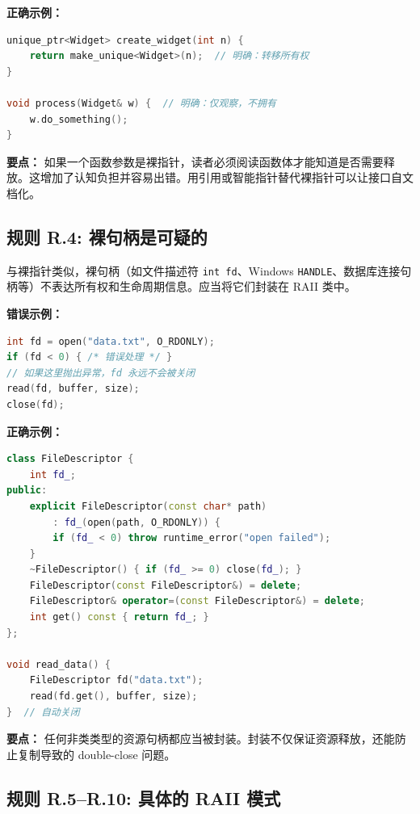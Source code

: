 \textbf{正确示例：}

\begin{lstlisting}[language=C++]
unique_ptr<Widget> create_widget(int n) {
    return make_unique<Widget>(n);  // 明确：转移所有权
}

void process(Widget& w) {  // 明确：仅观察，不拥有
    w.do_something();
}
\end{lstlisting}

\textbf{要点：} 如果一个函数参数是裸指针，读者必须阅读函数体才能知道是否需要释放。这增加了认知负担并容易出错。用引用或智能指针替代裸指针可以让接口自文档化。

\subsection*{\textbf{规则 R.4:} 裸句柄是可疑的}

与裸指针类似，裸句柄（如文件描述符 \texttt{int fd}、Windows \texttt{HANDLE}、数据库连接句柄等）不表达所有权和生命周期信息。应当将它们封装在 RAII 类中。

\textbf{错误示例：}

\begin{lstlisting}[language=C++]
int fd = open("data.txt", O_RDONLY);
if (fd < 0) { /* 错误处理 */ }
// 如果这里抛出异常，fd 永远不会被关闭
read(fd, buffer, size);
close(fd);
\end{lstlisting}

\textbf{正确示例：}

\begin{lstlisting}[language=C++]
class FileDescriptor {
    int fd_;
public:
    explicit FileDescriptor(const char* path)
        : fd_(open(path, O_RDONLY)) {
        if (fd_ < 0) throw runtime_error("open failed");
    }
    ~FileDescriptor() { if (fd_ >= 0) close(fd_); }
    FileDescriptor(const FileDescriptor&) = delete;
    FileDescriptor& operator=(const FileDescriptor&) = delete;
    int get() const { return fd_; }
};

void read_data() {
    FileDescriptor fd("data.txt");
    read(fd.get(), buffer, size);
}  // 自动关闭
\end{lstlisting}

\textbf{要点：} 任何非类类型的资源句柄都应当被封装。封装不仅保证资源释放，还能防止复制导致的 double-close 问题。

\subsection*{\textbf{规则 R.5--R.10:} 具体的 RAII 模式}

